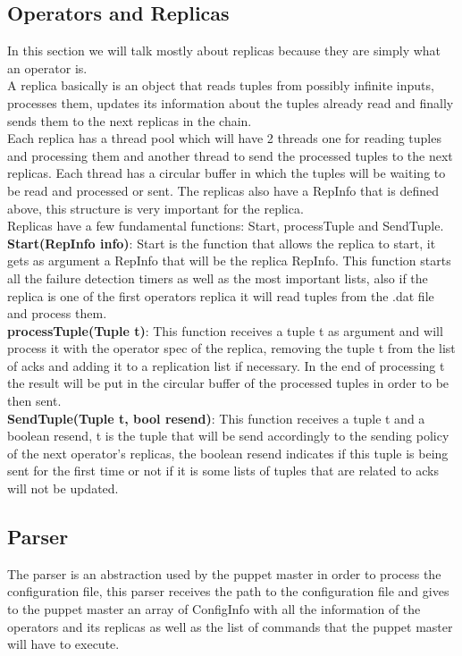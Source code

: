 \documentclass[times, 10pt, twocolumn]{article}
\begin{document}
\subsection{Operators and Replicas}
In this section we will talk mostly about replicas because they are simply what an operator is.
\\A replica basically is an object that reads tuples from possibly infinite inputs, processes them, updates its information about the tuples already read and finally sends them to the next replicas in the chain.
\\Each replica has a thread pool which will have 2 threads one for reading tuples and processing them and another thread to send the processed tuples to the next replicas. Each thread has a circular buffer in which the tuples will be waiting to be read and processed or sent. The replicas also have a RepInfo that is defined above, this structure is very important for the replica.
\\Replicas have a few fundamental functions: Start, processTuple and SendTuple.
\\\textbf{Start(RepInfo info)}: Start is the function that allows the replica to start, it gets as argument a RepInfo that will be the replica RepInfo. This function starts all the failure detection timers as well as the most important lists, also if the replica is one of the first operators replica it will read tuples from the .dat file and process them.
\\\textbf{processTuple(Tuple t)}: This function receives a tuple t as argument and will process it with the operator spec of the replica, removing the tuple t from the list of acks and adding it to a replication list if necessary. In the end of processing t the result will be put in the circular buffer of the processed tuples in order to be then sent.
\\\textbf{SendTuple(Tuple t, bool resend)}: This function receives a tuple t and a boolean resend, t is the tuple that will be send accordingly to the sending policy of the next operator's replicas, the boolean resend indicates if this tuple is being sent for the first time or not if it is some lists of tuples that are related to acks will not be updated.



\subsection{Parser}
The parser is an abstraction used by the puppet master in order to process the configuration file, this parser receives the path to the configuration file and gives to the puppet master an array of ConfigInfo with all the information of the operators and its replicas as well as the list of commands that the puppet master will have to execute.
\end{document}
